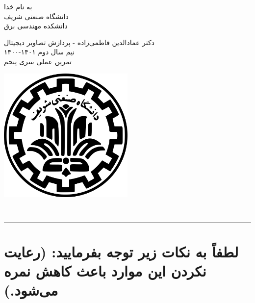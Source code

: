 \documentclass[a4]{article}
\begin{document}
\begin{minipage}{0.6\textwidth}
\begin{bf}
	\begin{center}
		به نام خدا\\
		\vspace{0.25cm}
		دانشگاه صنعتی شریف\\
		\vspace{0.25cm}
		دانشکده مهندسی برق\\
		\vspace{0.5cm}
	
	\large
	دکتر عمادالدین فاطمی‌زاده - پردازش تصاویر دیجیتال \\
	نیم سال دوم
	۱۴۰۱-۱۴۰۰\\
	\Large
	\vspace{0.4cm}
	تمرین عملی سری پنحم\\
	\end{center}
\end{bf}
\normalsize
\end{minipage} \hfill
\begin{minipage}{0.35\textwidth}
\begin{flushleft}
\includegraphics[width=0.5\textwidth]{Shariflogo.png}\\ \large
\end{flushleft}

 \end{minipage}
\\

\rule[0.1\baselineskip]{\textwidth}{1pt}

\large
\section*{
لطفاً به نکات زیر توجه بفرمایید: (رعایت نکردن این موارد باعث کاهش نمره می‌شود.)
}
\end{document}
